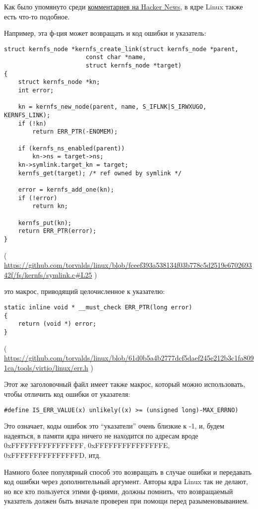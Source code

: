 Как было упомянуто среди \href{https://news.ycombinator.com/item?id=11823647}{комментариев на Hacker News},
в ядре Linux также есть что-то подобное.

Например, эта ф-ция может возвращать и код ошибки и указатель:

\begin{lstlisting}[style=customc]
struct kernfs_node *kernfs_create_link(struct kernfs_node *parent,
				       const char *name,
				       struct kernfs_node *target)
{
	struct kernfs_node *kn;
	int error;

	kn = kernfs_new_node(parent, name, S_IFLNK|S_IRWXUGO, KERNFS_LINK);
	if (!kn)
		return ERR_PTR(-ENOMEM);

	if (kernfs_ns_enabled(parent))
		kn->ns = target->ns;
	kn->symlink.target_kn = target;
	kernfs_get(target);	/* ref owned by symlink */

	error = kernfs_add_one(kn);
	if (!error)
		return kn;

	kernfs_put(kn);
	return ERR_PTR(error);
}
\end{lstlisting}

( \url{https://github.com/torvalds/linux/blob/fceef393a538134f03b778c5d2519e670269342f/fs/kernfs/symlink.c#L25} )

 это макрос, приводящий целочисленное к указателю:

\begin{lstlisting}[style=customc]
static inline void * __must_check ERR_PTR(long error)
{
	return (void *) error;
}
\end{lstlisting}

( \url{https://github.com/torvalds/linux/blob/61d0b5a4b2777dcf5daef245e212b3c1fa8091ca/tools/virtio/linux/err.h} )

Этот же заголовочный файл имеет также макрос, который можно использовать, чтобы отличить код ошибки от указателя:

\begin{lstlisting}[style=customc]
#define IS_ERR_VALUE(x) unlikely((x) >= (unsigned long)-MAX_ERRNO)
\end{lstlisting}

Это означает, коды ошибок это ``указатели'' очень близкие к -1, и, будем надеяться, в памяти ядра ничего не находится
по адресам вроде 0xFFFFFFFFFFFFFFFF, 0xFFFFFFFFFFFFFFFE, 0xFFFFFFFFFFFFFFFD, итд.

Намного более популярный способ это возвращать  в случае ошибки и передавать код ошибки через дополнительный
аргумент.
Авторы ядра Linux так не делают, но все кто пользуется этими ф-циями, должны помнить, что возвращаемый указатель
должен быть вначале проверен при помощи  перед разыменовыванием.

